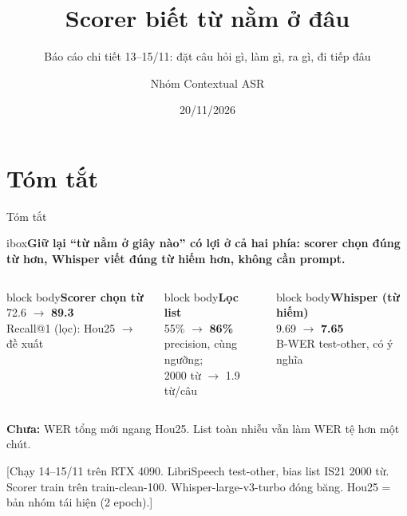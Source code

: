 \documentclass[aspectratio=169,xcolor=table]{beamer}
\title{Scorer biết từ nằm ở đâu}
\subtitle{Báo cáo chi tiết 13--15/11: đặt câu hỏi gì, làm gì, ra gì, đi tiếp đâu}
\author{Nhóm Contextual ASR}
\institute{}
\date{20/11/2026}
\newcommand{\bad}[1]{\textcolor{RiskRed}{\textbf{#1}}}
\newcommand{\good}[1]{\textcolor{GoodGreen}{\textbf{#1}}}
\newcommand{\src}[1]{\par\vfill{\tiny\color{TextGray}[#1]}}
\newcommand{\ra}{$\rightarrow$}
\newcommand{\nbox}[2][block body]{\begin{beamercolorbox}[sep=0.45em,rounded=true]{#1}\footnotesize #2\end{beamercolorbox}}
\newcommand{\nb}[1]{\textcolor{Accent}{#1}}
\newcommand{\insight}[1]{\begin{beamercolorbox}[sep=0.55em,rounded=true]{ibox}\small\bfseries #1\end{beamercolorbox}\vspace{0.15cm}}
\begin{document}
\begin{frame}[plain]\titlepage\end{frame}

\section{Tóm tắt}
\begin{frame}{Tóm tắt}
\insight{Giữ lại \nb{``từ nằm ở giây nào''} có lợi ở cả hai phía: scorer \nb{chọn đúng từ hơn}, Whisper \nb{viết đúng từ hiếm hơn}, không cần prompt.}
\begin{columns}[T]
\nbox{\textbf{Scorer chọn từ}\\[4pt]
{\Large 72.6 \ra{} \good{89.3}}\\[3pt]
Recall@1 (lọc): Hou25 \ra{} đề xuất}
\nbox{\textbf{Lọc list}\\[4pt]
{\Large 55\% \ra{} \good{86\%}}\\[3pt]
precision, cùng ngưỡng;\\ 2000 từ \ra{} 1.9 từ/câu}
\nbox{\textbf{Whisper (từ hiếm)}\\[4pt]
{\Large 9.69 \ra{} \good{7.65}}\\[3pt]
B-WER test-other, có ý nghĩa}
\end{columns}
\vspace{0.3cm}
{\small\bad{Chưa:} WER tổng mới ngang Hou25. List toàn nhiễu vẫn làm WER tệ hơn một chút.\par}
\src{Chạy 14--15/11 trên RTX 4090. LibriSpeech test-other, bias list IS21 2000 từ. Scorer train trên train-clean-100. Whisper-large-v3-turbo đóng băng. Hou25 = bản nhóm tái hiện (2 epoch).}
\end{frame}
\end{document}
